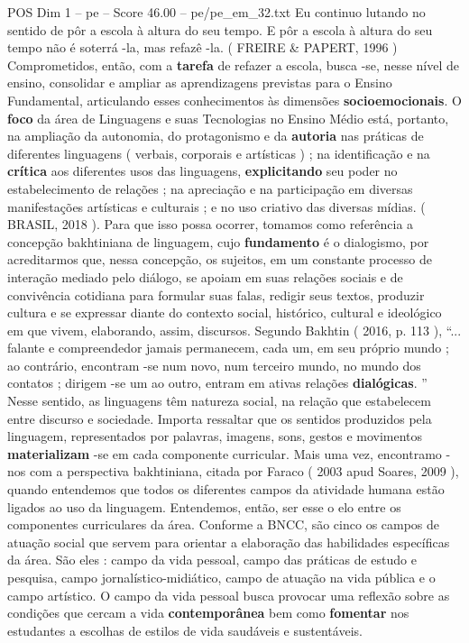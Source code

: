 \begin{textsample}{POS Dim 1 – pe – Score 46.00 – pe/pe\_em\_32.txt}
Eu continuo lutando no sentido de pôr a escola à altura do seu tempo.
E pôr a escola à altura do seu tempo não é soterrá -la, mas refazê -la. ( FREIRE \& PAPERT, 1996 ) Comprometidos, então, com a \textbf{tarefa} de refazer a escola, busca -se, nesse nível de ensino, consolidar e ampliar as aprendizagens previstas para o Ensino Fundamental, articulando esses conhecimentos às dimensões \textbf{socioemocionais}.
O \textbf{foco} da área de Linguagens e suas Tecnologias no Ensino Médio está, portanto, na ampliação da autonomia, do protagonismo e da \textbf{autoria} nas práticas de diferentes linguagens ( verbais, corporais e artísticas ) ; na identificação e na \textbf{crítica} aos diferentes usos das linguagens, \textbf{explicitando} seu poder no estabelecimento de relações ; na apreciação e na participação em diversas manifestações artísticas e culturais ; e no uso criativo das diversas mídias. ( BRASIL, 2018 ).
Para que isso possa ocorrer, tomamos como referência a concepção bakhtiniana de linguagem, cujo \textbf{fundamento} é o dialogismo, por acreditarmos que, nessa concepção, os sujeitos, em um constante processo de interação mediado pelo diálogo, se apoiam em suas relações sociais e de convivência cotidiana para formular suas falas, redigir seus textos, produzir cultura e se expressar diante do contexto social, histórico, cultural e ideológico em que vivem, elaborando, assim, discursos.
Segundo Bakhtin ( 2016, p. 113 ), “... falante e compreendedor jamais permanecem, cada um, em seu próprio mundo ; ao contrário, encontram -se num novo, num terceiro mundo, no mundo dos contatos ; dirigem -se um ao outro, entram em ativas relações \textbf{dialógicas}. ” Nesse sentido, as linguagens têm natureza social, na relação que estabelecem entre discurso e sociedade.
Importa ressaltar que os sentidos produzidos pela linguagem, representados por palavras, imagens, sons, gestos e movimentos \textbf{materializam} -se em cada componente curricular.
Mais uma vez, encontramo -nos com a perspectiva bakhtiniana, citada por Faraco ( 2003 apud Soares, 2009 ), quando entendemos que todos os diferentes campos da atividade humana estão ligados ao uso da linguagem.
Entendemos, então, ser esse o elo entre os componentes curriculares da área.
Conforme a BNCC, são cinco os campos de atuação social que servem para orientar a elaboração das habilidades específicas da área.
São eles : campo da vida pessoal, campo das práticas de estudo e pesquisa, campo jornalístico-midiático, campo de atuação na vida pública e o campo artístico.
O campo da vida pessoal busca provocar uma reflexão sobre as condições que cercam a vida \textbf{contemporânea} bem como \textbf{fomentar} nos estudantes a escolhas de estilos de vida saudáveis e sustentáveis.

\end{textsample}
